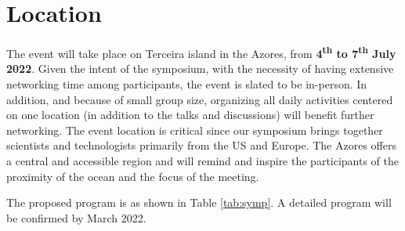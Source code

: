 \section{Location}

The event will take place on Terceira island in the Azores, from
\textbf{4\textsuperscript{th} to 7\textsuperscript{th} July
  2022}. Given the intent of the symposium, with the necessity of
having extensive networking time among participants, the event is
slated to be in-person. In addition, and because of small group size,
organizing all daily activities centered on one location (in addition
to the talks and discussions) will benefit further networking. The
event location is critical since our symposium brings together
scientists and technologists primarily from the US and Europe. The
Azores offers a central and accessible region and will remind and
inspire the participants of the proximity of the ocean and the focus
of the meeting.

\noindent
The proposed program is as shown in Table \ref{tab:symp}. A detailed
program will be confirmed by March 2022.

